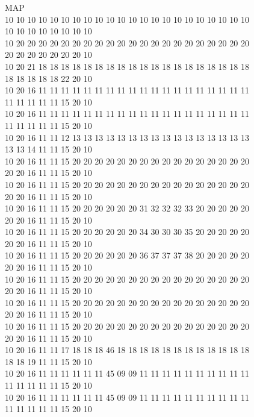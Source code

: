 \begin{figure}[h]
\centering
\begin{minipage}{1.0\textwidth}
\centering
\begin{minipage}[t]{0.6\textwidth}
\centering
\begin{spacing}{1.0}
\fontsmall
MAP\\
10 10 10 10 10 10 10 10 10 10 10 10 10 10 10 10 10 10 10 10 10 10 10 10 10 10 10 10 10 10\\
10 20 20 20 20 20 20 20 20 20 20 20 20 20 20 20 20 20 20 20 20 20 20 20 20 20 20 20 20 10\\
10 20 21 18 18 18 18 18 18 18 18 18 18 18 18 18 18 18 18 18 18 18 18 18 18 18 18 22 20 10\\
10 20 16 11 11 11 11 11 11 11 11 11 11 11 11 11 11 11 11 11 11 11 11 11 11 11 11 15 20 10\\
10 20 16 11 11 11 11 11 11 11 11 11 11 11 11 11 11 11 11 11 11 11 11 11 11 11 11 15 20 10\\
10 20 16 11 11 12 13 13 13 13 13 13 13 13 13 13 13 13 13 13 13 13 13 13 14 11 11 15 20 10\\
10 20 16 11 11 15 20 20 20 20 20 20 20 20 20 20 20 20 20 20 20 20 20 20 16 11 11 15 20 10\\
10 20 16 11 11 15 20 20 20 20 20 20 20 20 20 20 20 20 20 20 20 20 20 20 16 11 11 15 20 10\\
10 20 16 11 11 15 20 20 20 20 20 20 31 32 32 32 33 20 20 20 20 20 20 20 16 11 11 15 20 10\\
10 20 16 11 11 15 20 20 20 20 20 20 34 30 30 30 35 20 20 20 20 20 20 20 16 11 11 15 20 10\\
10 20 16 11 11 15 20 20 20 20 20 20 36 37 37 37 38 20 20 20 20 20 20 20 16 11 11 15 20 10\\
10 20 16 11 11 15 20 20 20 20 20 20 20 20 20 20 20 20 20 20 20 20 20 20 16 11 11 15 20 10\\
10 20 16 11 11 15 20 20 20 20 20 20 20 20 20 20 20 20 20 20 20 20 20 20 16 11 11 15 20 10\\
10 20 16 11 11 15 20 20 20 20 20 20 20 20 20 20 20 20 20 20 20 20 20 20 16 11 11 15 20 10\\
10 20 16 11 11 17 18 18 18 46 18 18 18 18 18 18 18 18 18 18 18 18 18 18 19 11 11 15 20 10\\
10 20 16 11 11 11 11 11 11 45 09 09 11 11 11 11 11 11 11 11 11 11 11 11 11 11 11 15 20 10\\
10 20 16 11 11 11 11 11 11 45 09 09 11 11 11 11 11 11 11 11 11 11 11 11 11 11 11 15 20 10\\

\end{spacing}
\end{minipage}
\end{minipage}
\end{figure}
